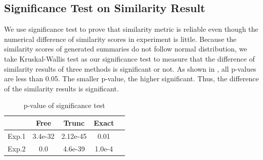 \subsection{Significance Test on Similarity Result}

We use significance test to prove that similarity metric is reliable 
even though the numerical difference of similarity scores in experiment
is little. Because the similarity scores of generated summaries do not follow
normal distribution, we take Kruskal-Wallis test \cite{loukina2014automatic,albert2017exploring} as our
significance test to measure that the difference of similarity results of three methods
is significant or not. As shown in , all p-values are less than 0.05. 
The smaller p-value, the higher significant.
Thus, the difference of the similarity results is significant. 

\begin{table}[th]
	\small
	\centering
	\caption{p-value of significance test}
	\label{tab:pvalue}
	\begin{tabular}{lcccc}
		\hline
		\multicolumn{1}{c}{}& Free & Trunc & Exact  \\ \hline
		\multicolumn{1}{c|}{Exp.1} & 3.4e-32 & 2.12e-45 & 0.01  \\ \cline{1-4}
		\multicolumn{1}{c|}{Exp.2} & 0.0 & 4.6e-39 & 1.0e-4  \\ \cline{1-4}
		\hline
	\end{tabular}
\end{table}

